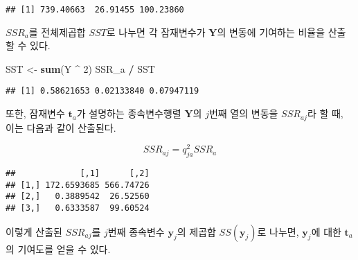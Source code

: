 \documentclass[]{book}
\newenvironment{Shaded}{\begin{snugshade}}{\end{snugshade}}
\newcommand{\DecValTok}[1]{\textcolor[rgb]{0.00,0.00,0.81}{#1}}
\newcommand{\KeywordTok}[1]{\textcolor[rgb]{0.13,0.29,0.53}{\textbf{#1}}}
\newcommand{\NormalTok}[1]{#1}
\newcommand{\OperatorTok}[1]{\textcolor[rgb]{0.81,0.36,0.00}{\textbf{#1}}}
\newcommand{\StringTok}[1]{\textcolor[rgb]{0.31,0.60,0.02}{#1}}
\begin{document}
\begin{verbatim}
## [1] 739.40663  26.91455 100.23860
\end{verbatim}

\(SSR_a\)를 전체제곱합 \(SST\)로 나누면 각 잠재변수가 \(\mathbf{Y}\)의 변동에 기여하는 비율을 산출할 수 있다.

\begin{Shaded}
\begin{Highlighting}[]
\NormalTok{SST <-}\StringTok{ }\KeywordTok{sum}\NormalTok{(Y }\OperatorTok{^}\StringTok{ }\DecValTok{2}\NormalTok{)}
\NormalTok{SSR_a }\OperatorTok{/}\StringTok{ }\NormalTok{SST}
\end{Highlighting}
\end{Shaded}

\begin{verbatim}
## [1] 0.58621653 0.02133840 0.07947119
\end{verbatim}

또한, 잠재변수 \(\mathbf{t}_a\)가 설명하는 종속변수행렬 \(\mathbf{Y}\)의 \(j\)번째 열의 변동을 \(SSR_{aj}\)라 할 때, 이는 다음과 같이 산출된다.

\begin{equation}
SSR_{aj} = q_{ja}^2 SSR_a
\end{equation}

\begin{Shaded}
\end{Shaded}

\begin{verbatim}
##             [,1]      [,2]
## [1,] 172.6593685 566.74726
## [2,]   0.3889542  26.52560
## [3,]   0.6333587  99.60524
\end{verbatim}

이렇게 산출된 \(SSR_{aj}\)를 \(j\)번째 종속변수 \(\mathbf{y}_j\)의 제곱합 \(SS(\mathbf{y}_j)\)로 나누면, \(\mathbf{y}_j\)에 대한 \(\mathbf{t}_a\)의 기여도를 얻을 수 있다.

\begin{Shaded}
\end{Shaded}
\end{document}
